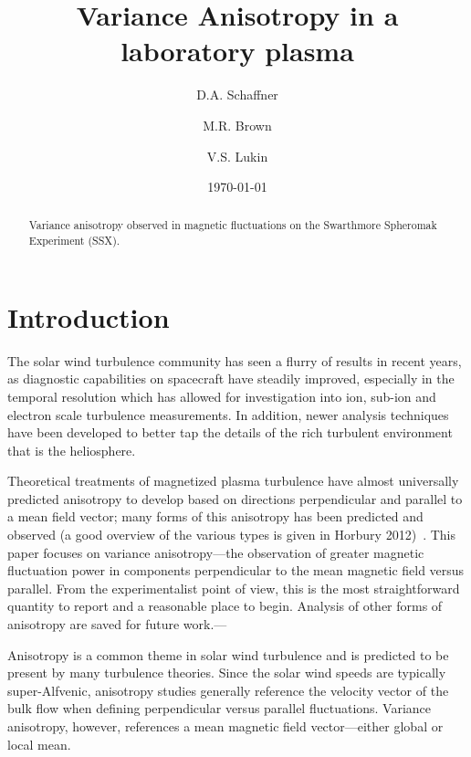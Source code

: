 \documentclass[aip,prl,amsmath,amssymb,reprint,superscriptaddress]{revtex4-1} %
\begin{document}
\title{Variance Anisotropy in a laboratory plasma}

\author{D.A. Schaffner}
\author{M.R. Brown}
\author{V.S. Lukin}

\date{\today}
\begin{abstract}
Variance anisotropy observed in magnetic fluctuations on the Swarthmore Spheromak Experiment (SSX).
\end{abstract}

\maketitle

\section{Introduction}

The solar wind turbulence community has seen a flurry of results in recent years, as diagnostic capabilities on spacecraft have steadily improved, especially in the temporal resolution which has allowed for investigation into ion, sub-ion and electron scale turbulence measurements. In addition, newer analysis techniques have been developed to better tap the details of the rich turbulent environment that is the heliosphere. 

Theoretical treatments of magnetized plasma turbulence have almost universally predicted anisotropy to develop based on directions perpendicular and parallel to a mean field vector; many forms of this anisotropy has been predicted and observed (a good overview of the various types is given in Horbury 2012)~\cite{horbury12}. This paper focuses on variance anisotropy---the observation of greater magnetic fluctuation power in components perpendicular to the mean magnetic field versus parallel. From the experimentalist point of view, this is the most straightforward quantity to report and a reasonable place to begin. Analysis of other forms of anisotropy are saved for future work.---%

Anisotropy is a common theme in solar wind turbulence and is predicted to be present by many turbulence theories. Since the solar wind speeds are typically super-Alfvenic, anisotropy studies generally reference the velocity vector of the bulk flow when defining perpendicular versus parallel fluctuations. Variance anisotropy, however, references a mean magnetic field vector---either global or local mean.
\end{document}
